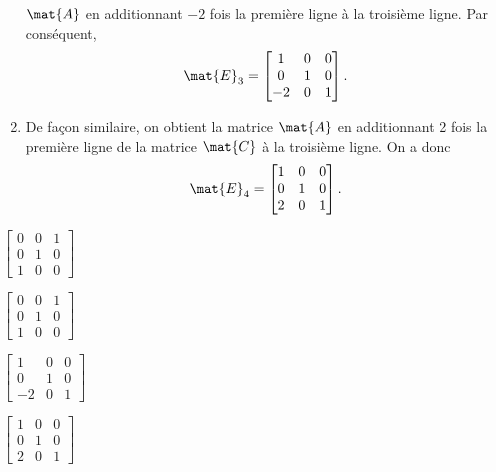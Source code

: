 \begin{exercice}
\begin{sol}
\begin{enumerate}
      $\mat{A}$ en additionnant $-2$ fois la première ligne à la
      troisième ligne. Par conséquent,
      \begin{displaymath}
        \mat{E}_3 =
        \begin{bmatrix}
          1 & 0 & 0 \\ 0 & 1 & 0 \\ -2 & 0 & 1
        \end{bmatrix}.
      \end{displaymath}
    \item De façon similaire, on obtient la matrice $\mat{A}$ en
      additionnant 2 fois la première ligne de la matrice $\mat{C}$ à
      la troisième ligne. On a donc
      \begin{displaymath}
        \mat{E}_4 =
        \begin{bmatrix}
          1 & 0 & 0 \\ 0 & 1 & 0 \\ 2 & 0 & 1
        \end{bmatrix}.
      \end{displaymath}
    \end{enumerate}
  \end{sol}
  \begin{rep}
    \begin{inparaenum}
    \item $\begin{bmatrix} 0&0&1 \\ 0&1&0 \\ 1&0&0 \end{bmatrix}$
    \item $\begin{bmatrix} 0&0&1 \\ 0&1&0 \\ 1&0&0 \end{bmatrix}$
    \item $\begin{bmatrix} 1&0&0 \\ 0&1&0 \\ -2&0&1 \end{bmatrix}$
    \item $\begin{bmatrix} 1&0&0 \\ 0&1&0 \\ 2&0&1 \end{bmatrix}$
    \end{inparaenum}
  \end{rep}
\end{exercice}

